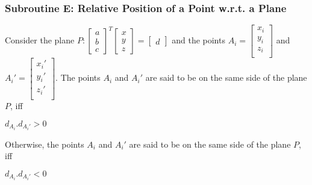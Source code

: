 \documentclass[12pt]{report}
\begin{document}
\subsubsection*{Subroutine E: Relative Position of a Point w.r.t. a Plane}
Consider the plane \(P: \begin{bmatrix} a \\ b \\ c \end{bmatrix}^{T} \begin{bmatrix} x \\ y \\ z \end{bmatrix} = \begin{bmatrix} d \end{bmatrix}\) and the points \(A_{i} = \begin{bmatrix}  x_{i} \\ y_{i} \\ z_{i} \\ \end{bmatrix} \) and \(A_{i}' = \begin{bmatrix}  x_{i}' \\ y_{i}' \\ z_{i}' \\ \end{bmatrix} \). The points \(A_{i} \) and \(A_{i}' \) are said to be on the same side of the plane \(P \), iff \\
\centerline{\(d_{A_{i}}.d_{A_{i}'} > 0 \)}
Otherwise, the points \(A_{i} \) and \(A_{i}' \) are said to be on the same side of the plane \(P \), iff \\
\centerline{\(d_{A_{i}}.d_{A_{i}'} < 0 \)}
\end{document}
